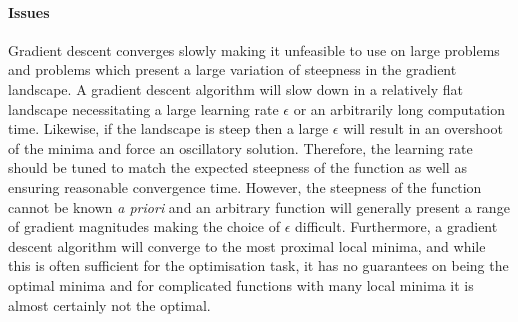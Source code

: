 \paragraph{Issues}
Gradient descent converges slowly making it unfeasible to use on large problems and problems which present a large variation of steepness in the gradient landscape. A gradient descent algorithm will slow down in a relatively flat landscape necessitating a large learning rate $\epsilon$ or an arbitrarily long computation time. Likewise, if the landscape is steep then a large $\epsilon$ will result in an overshoot of the minima and force an oscillatory solution. Therefore, the learning rate should be tuned to match the expected steepness of the function as well as ensuring reasonable convergence time. However, the steepness of the function cannot be known \textit{a priori} and an arbitrary function will generally present a range of gradient magnitudes making the choice of $\epsilon$ difficult. Furthermore, a gradient descent algorithm will converge to the most proximal local minima, and while this is often sufficient for the optimisation task, it has no guarantees on being the optimal minima and for complicated functions with many local minima it is almost certainly not the optimal.
